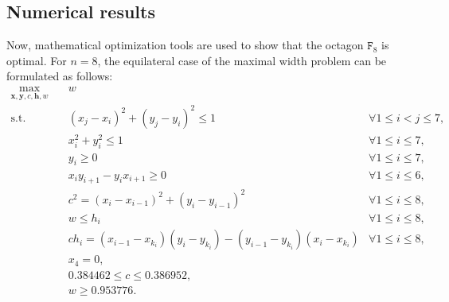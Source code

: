 \documentclass[a4paper,12pt]{article}
\theoremstyle{definition}
\theoremstyle{plain}
\newcommand{\rv}[1]{\boldsymbol{#1}}
\newcommand{\geo}[1]{\mathtt{#1}}
\DeclareMathOperator{\subj}{s.t.}
\begin{document}
\subsection{Numerical results}
Now, mathematical optimization tools are used to show that the octagon $\geo{F}_8$ is optimal. For $n = 8$, the equilateral case of the maximal width problem can be formulated as follows:
\begin{subequations}\label{eq:8gon:width}
	\begin{align}
		\max_{\rv{x},\rv{y},c,\rv{h},w} \quad & w\\
		\subj \quad & (x_j - x_i)^2 + (y_j - y_i)^2 \le 1 &\forall 1\le i < j \le 7,\label{eq:ngon:d}\\
		& x_i^2 + y_i^2 \le 1 &\forall 1 \le i \le 7,\label{eq:ngon:r}\\
		& y_i \ge 0 &\forall 1 \le i \le 7,\label{eq:ngon:y}\\
		& x_iy_{i+1} - y_ix_{i+1} \ge 0 &\forall 1 \le i \le 6,\label{eq:ngon:order}\\
		& c^2 =  (x_i - x_{i-1})^2 + (y_i - y_{i-1})^2 &\forall 1 \le i \le 8,\label{eq:ngon:vi}\\
		& w \le h_i &\forall 1 \le i \le 8,\label{eq:ngon:hi}\\
		& c h_i = (x_{i-1}-x_{k_i})(y_i-y_{k_i}) - (y_{i-1}-y_{k_i})(x_i-x_{k_i})	&\forall 1 \le i \le 8,\\
		& x_4 = 0,\\
		& 0.384462 \le c \le 0.386952,\\
		& w \ge 0.953776.
	\end{align}
\end{subequations}
\end{document}
